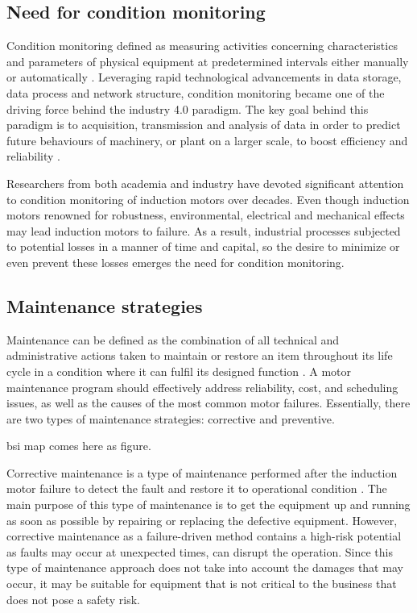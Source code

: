 \subsection{Need for condition monitoring}

Condition monitoring defined as measuring activities concerning characteristics and parameters of physical equipment at predetermined intervals either manually or automatically \cite{en201713306}. Leveraging rapid technological advancements in data storage, data process and network structure, condition monitoring became one of the driving force behind the industry 4.0 paradigm. The key goal behind this paradigm is to acquisition, transmission and analysis of data in order to predict future behaviours of machinery, or plant on a larger scale, to boost efficiency and reliability \cite{lughofer2019prologue,RUIZSARMIENTO}. 

Researchers from both academia and industry have devoted significant attention to condition monitoring of induction motors over decades. Even though induction motors renowned for robustness, environmental, electrical and mechanical effects may lead induction motors to failure. As a result, industrial processes subjected to potential losses in a manner of time and capital, so the desire to minimize or even prevent these losses emerges the need for condition monitoring. 

\subsection{Maintenance strategies}

Maintenance can be defined as the combination of all technical and administrative actions taken to maintain or restore an item throughout its life cycle in a condition where it can fulfil its designed function \cite{en201713306}. A motor maintenance program should effectively address reliability, cost, and scheduling issues, as well as the causes of the most common motor failures. Essentially, there are two types of maintenance strategies: corrective and preventive. 

bsi map comes here as figure.

Corrective maintenance is a type of maintenance performed after the induction motor failure to detect the fault and restore it to operational condition \cite{en201713306}. The main purpose of this type of maintenance is to get the equipment up and running as soon as possible by repairing or replacing the defective equipment. However, corrective maintenance as a failure-driven method contains a high-risk potential as faults may occur at unexpected times, can disrupt the operation. Since this type of maintenance approach does not take into account the damages that may occur, it may be suitable for equipment that is not critical to the business that does not pose a safety risk.

